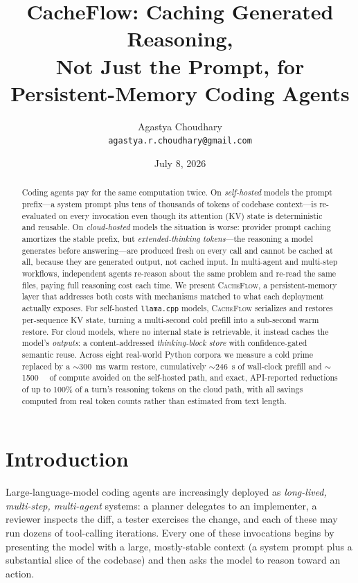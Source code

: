 \documentclass[10pt]{article}
\title{\vspace{-2.5em}\textbf{\color{cfblue}CacheFlow}: Caching Generated Reasoning,\\Not Just the Prompt, for Persistent-Memory Coding Agents}
\author{%
  Agastya Choudhary\\
  \normalsize\texttt{agastya.r.choudhary@gmail.com}
}
\date{\normalsize July 8, 2026}
\begin{document}
\maketitle
\begin{abstract}
\noindent
Coding agents pay for the same computation twice. On \emph{self-hosted} models
the prompt prefix---a system prompt plus tens of thousands of tokens of
codebase context---is re-evaluated on every invocation even though its
attention (KV) state is deterministic and reusable. On \emph{cloud-hosted}
models the situation is worse: provider prompt caching amortizes the stable
prefix, but \emph{extended-thinking tokens}---the reasoning a model generates
before answering---are produced fresh on every call and cannot be cached at
all, because they are generated output, not cached input. In multi-agent and
multi-step workflows, independent agents re-reason about the same problem and
re-read the same files, paying full reasoning cost each time.
We present \textsc{CacheFlow}, a persistent-memory layer that addresses both
costs with mechanisms matched to what each deployment actually exposes. For
self-hosted \texttt{llama.cpp} models, \textsc{CacheFlow} serializes and
restores per-sequence KV state, turning a multi-second cold prefill into a
sub-second warm restore. For cloud models, where no internal state is
retrievable, it instead caches the model's \emph{outputs}: a content-addressed
\emph{thinking-block store} with confidence-gated semantic reuse. Across eight
real-world Python corpora we measure a cold prime replaced by a
$\sim$\SI{300}{\milli\second} warm restore, cumulatively
$\sim$\SI{246}{\second} of wall-clock prefill and $\sim$\SI{1500}{\tera\flop}
of compute avoided on the self-hosted path, and exact, API-reported reductions
of up to 100\% of a turn's reasoning tokens on the cloud path, with all savings
computed from real token counts rather than estimated from text length.
\end{abstract}
\vspace{1em}

\section{Introduction}
\label{sec:intro}

Large-language-model coding agents are increasingly deployed as
\emph{long-lived, multi-step, multi-agent} systems: a planner delegates to an
implementer, a reviewer inspects the diff, a tester exercises the change, and
each of these may run dozens of tool-calling iterations. Every one of these
invocations begins by presenting the model with a large, mostly-stable context
(a system prompt plus a substantial slice of the codebase) and then asks the
model to reason toward an action.
\end{document}
